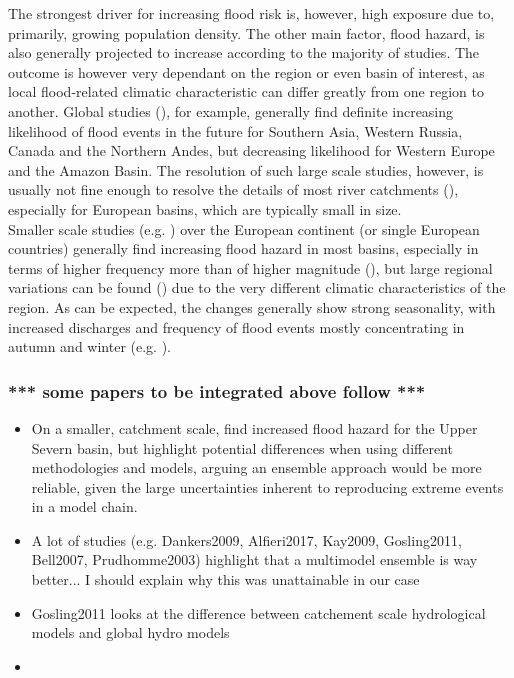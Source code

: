 The strongest driver for increasing flood risk is, however, high exposure due to, primarily, growing population density. The other main factor, flood hazard, is also generally projected to increase according to the majority of studies. The outcome is however very dependant on the region or even basin of interest, as local flood-related climatic characteristic can differ greatly from one region to another. Global studies (\cite{Hirabayashi2013, Arnell2016, Dankers2014, Hirabayashi2008, Alfieri2017, Milly2002}), for example, generally find definite increasing likelihood of flood events in the future for Southern Asia, Western Russia, Canada and the Northern Andes, but decreasing likelihood for Western Europe and the Amazon Basin. The resolution of such large scale studies, however, is usually not fine enough to resolve the details of most river catchments (\cite{Whitfield2012, Gosling2011}), especially for European basins, which are typically small in size.\\
Smaller scale studies (e.g. \cite{Dankers2009, Alfieri2015a, Prudhomme2003}) over the European continent (or single European countries) generally find increasing flood hazard in most basins, especially in terms of higher frequency more than of higher magnitude (\cite{Alfieri2015a, Lehner2006}), but large regional variations can be found (\cite{Rojas2012}) due to the very different climatic characteristics of the region. As can be expected, the changes generally show strong seasonality, with increased discharges and frequency of flood events mostly concentrating in autumn and winter (e.g. \cite{Middelkoop2001}).

\subsubsection{*** some papers to be integrated above follow ***}
\begin{itemize}
    \item  On a smaller, catchment scale, \cite{Cloke2013} find increased flood hazard for the Upper Severn basin, but highlight potential differences when using different methodologies and models, arguing an ensemble approach would be more reliable, given the large uncertainties inherent to reproducing extreme events in a model chain.
    \item A lot of studies (e.g. Dankers2009, Alfieri2017, Kay2009, Gosling2011, Bell2007, Prudhomme2003) highlight that a multimodel ensemble is way better... I should explain why this was unattainable in our case
    \item Gosling2011 looks at the difference between catchement scale hydrological models and global hydro models
    \item
\end{itemize}








